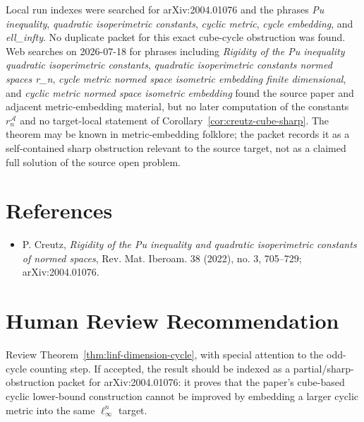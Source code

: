 \documentclass[11pt]{article}
\begin{document}
Local run indexes were searched for arXiv:2004.01076 and the phrases \emph{Pu inequality}, \emph{quadratic isoperimetric constants}, \emph{cyclic metric}, \emph{cycle embedding}, and \emph{ell\_infty}. No duplicate packet for this exact cube-cycle obstruction was found. Web searches on 2026-07-18 for phrases including \emph{Rigidity of the Pu inequality quadratic isoperimetric constants}, \emph{quadratic isoperimetric constants normed spaces r\_n}, \emph{cycle metric normed space isometric embedding finite dimensional}, and \emph{cyclic metric normed space isometric embedding} found the source paper and adjacent metric-embedding material, but no later computation of the constants $r_n^{\mathcal A}$ and no target-local statement of Corollary~\ref{cor:creutz-cube-sharp}. The theorem may be known in metric-embedding folklore; the packet records it as a self-contained sharp obstruction relevant to the source target, not as a claimed full solution of the source open problem.

\section*{References}

\begin{itemize}[leftmargin=2em]
\item P. Creutz, \emph{Rigidity of the Pu inequality and quadratic isoperimetric constants of normed spaces}, Rev. Mat. Iberoam. 38 (2022), no. 3, 705--729; arXiv:2004.01076.
\end{itemize}

\section*{Human Review Recommendation}

Review Theorem~\ref{thm:linf-dimension-cycle}, with special attention to the odd-cycle counting step. If accepted, the result should be indexed as a partial/sharp-obstruction packet for arXiv:2004.01076: it proves that the paper's cube-based cyclic lower-bound construction cannot be improved by embedding a larger cyclic metric into the same $\ell_\infty^n$ target.
\end{document}
